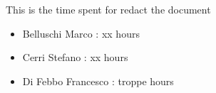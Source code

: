 This is the time spent for redact the document
\begin{itemize}
	\item Belluschi Marco : xx hours
	\item Cerri Stefano : xx hours
	\item Di Febbo Francesco : troppe hours
\end{itemize}